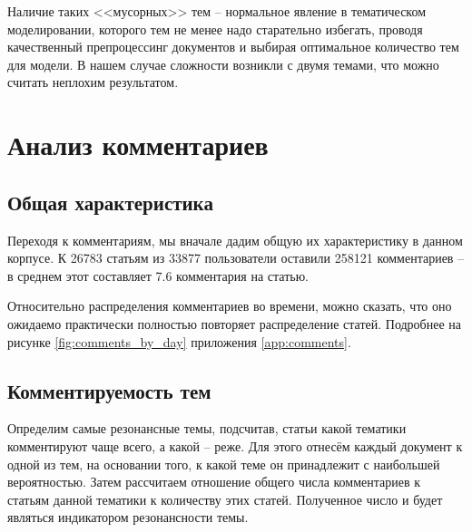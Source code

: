 Наличие таких <<мусорных>> тем -- нормальное явление в тематическом моделировании, которого тем не менее надо старательно избегать, проводя качественный препроцессинг документов и выбирая оптимальное количество тем для модели. В нашем случае сложности возникли с двумя темами, что можно считать неплохим результатом.

\section{Анализ комментариев}
\subsection{Общая характеристика}
Переходя к комментариям, мы вначале дадим общую их характеристику в данном корпусе. К 26783 статьям  из 33877 пользователи оставили 258121 комментариев -- в среднем этот составляет 7.6 комментария на статью.

Относительно распределения комментариев во времени, можно сказать, что оно ожидаемо практически полностью повторяет распределение статей. Подробнее на рисунке \ref{fig:comments_by_day} приложения \ref{app:comments}.

\subsection{Комментируемость тем}
Определим самые резонансные темы, подсчитав, статьи какой тематики комментируют чаще всего, а какой -- реже. Для этого отнесём каждый документ к одной из тем, на основании  того, к какой теме он принадлежит с наибольшей вероятностью. Затем рассчитаем отношение общего числа комментариев к статьям данной тематики к количеству этих статей. Полученное число и будет являться индикатором резонансности темы.

